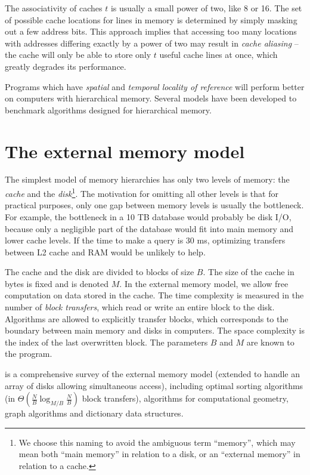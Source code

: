 The associativity of caches $t$ is usually a small power of two, like 8 or 16.
The set of possible cache locations for lines in memory is determined
by simply masking out a few address bits. This approach implies that
accessing too many locations with addresses differing exactly by a power
of two may result in \emph{cache aliasing} -- the cache will only be able
to store only $t$ useful cache lines at once, which greatly degrades its
performance.

Programs which have \emph{spatial} and \emph{temporal locality of reference}
will perform better on computers with hierarchical memory. Several models have
been developed to benchmark algorithms designed for hierarchical memory.

\section{The external memory model}
The simplest model of memory hierarchies has only two levels of memory:
the \emph{cache} and the \emph{disk}\footnote{
	We choose this naming to avoid the ambiguous term ``memory'',
	which may mean both ``main memory'' in relation to a disk,
	or an ``external memory'' in relation to a cache.
}. The motivation for omitting all other levels is that for practical purposes,
only one gap between memory levels is usually the bottleneck. For example,
the bottleneck in a 10 TB database would probably be disk I/O, because
only a negligible part of the database would fit into main memory and
lower cache levels. If the time to make a query is 30 ms, optimizing transfers
between L2 cache and RAM would be unlikely to help.

The cache and the disk are divided to blocks of size $B$. The size of the cache 
in bytes is fixed and is denoted $M$.
In the external memory model, we allow free computation on data
stored in the cache. The time complexity is measured in the number of
\emph{block transfers}, which read or write an entire block to the disk.
Algorithms are allowed to explicitly transfer blocks, which corresponds
to the boundary between main memory and disks in computers.
The space complexity is the index of the last overwritten block.
The parameters $B$ and $M$ are known to the program.

\cite{em-ads} is a comprehensive survey of the external memory model
(extended to handle an array of disks allowing simultaneous access), including
optimal sorting algorithms (in $\Theta(\frac{N}{B}\log_{M/B}\frac{N}{B})$
block transfers), algorithms for computational geometry, graph algorithms
and dictionary data structures.

